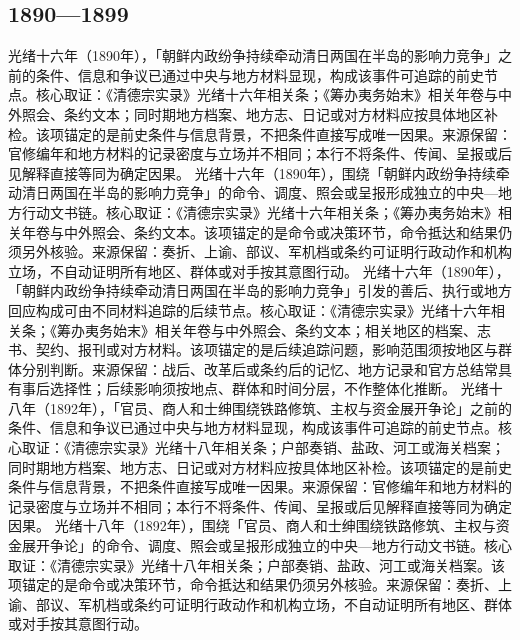 \subsection{1890—1899}
光绪十六年（1890年），「朝鲜内政纷争持续牵动清日两国在半岛的影响力竞争」之前的条件、信息和争议已通过中央与地方材料显现，构成该事件可追踪的前史节点。核心取证：《清德宗实录》光绪十六年相关条；《筹办夷务始末》相关年卷与中外照会、条约文本；同时期地方档案、地方志、日记或对方材料应按具体地区补检。该项锚定的是前史条件与信息背景，不把条件直接写成唯一因果。来源保留：官修编年和地方材料的记录密度与立场并不相同；本行不将条件、传闻、呈报或后见解释直接等同为确定因果。
光绪十六年（1890年），围绕「朝鲜内政纷争持续牵动清日两国在半岛的影响力竞争」的命令、调度、照会或呈报形成独立的中央—地方行动文书链。核心取证：《清德宗实录》光绪十六年相关条；《筹办夷务始末》相关年卷与中外照会、条约文本。该项锚定的是命令或决策环节，命令抵达和结果仍须另外核验。来源保留：奏折、上谕、部议、军机档或条约可证明行政动作和机构立场，不自动证明所有地区、群体或对手按其意图行动。
光绪十六年（1890年），「朝鲜内政纷争持续牵动清日两国在半岛的影响力竞争」引发的善后、执行或地方回应构成可由不同材料追踪的后续节点。核心取证：《清德宗实录》光绪十六年相关条；《筹办夷务始末》相关年卷与中外照会、条约文本；相关地区的档案、志书、契约、报刊或对方材料。该项锚定的是后续追踪问题，影响范围须按地区与群体分别判断。来源保留：战后、改革后或条约后的记忆、地方记录和官方总结常具有事后选择性；后续影响须按地点、群体和时间分层，不作整体化推断。
光绪十八年（1892年），「官员、商人和士绅围绕铁路修筑、主权与资金展开争论」之前的条件、信息和争议已通过中央与地方材料显现，构成该事件可追踪的前史节点。核心取证：《清德宗实录》光绪十八年相关条；户部奏销、盐政、河工或海关档案；同时期地方档案、地方志、日记或对方材料应按具体地区补检。该项锚定的是前史条件与信息背景，不把条件直接写成唯一因果。来源保留：官修编年和地方材料的记录密度与立场并不相同；本行不将条件、传闻、呈报或后见解释直接等同为确定因果。
光绪十八年（1892年），围绕「官员、商人和士绅围绕铁路修筑、主权与资金展开争论」的命令、调度、照会或呈报形成独立的中央—地方行动文书链。核心取证：《清德宗实录》光绪十八年相关条；户部奏销、盐政、河工或海关档案。该项锚定的是命令或决策环节，命令抵达和结果仍须另外核验。来源保留：奏折、上谕、部议、军机档或条约可证明行政动作和机构立场，不自动证明所有地区、群体或对手按其意图行动。
